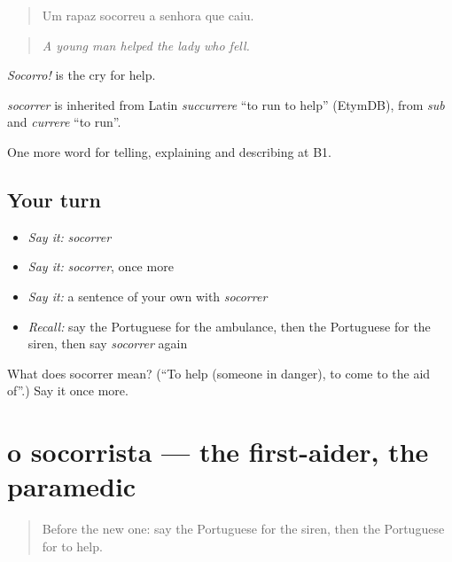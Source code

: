 \begin{quote}
Um rapaz socorreu a senhora que caiu.
\end{quote}

\begin{quote}
\emph{A young man helped the lady who fell.}
\end{quote}

\emph{Socorro!} is the cry for help.

\begin{cousinweb}
\emph{socorrer} is inherited from Latin \emph{succurrere} \textquotedblleft{}to run to help\textquotedblright{} (EtymDB), from \emph{sub} and \emph{currere} \textquotedblleft{}to run\textquotedblright{}.
\end{cousinweb}

\begin{grammarlens}[title={What you've built}]
One more word for telling, explaining and describing at B1.
\end{grammarlens}

\subsection*{Your turn}
\begin{itemize}
\raggedright
  \item \emph{Say it:} \emph{socorrer}
  \item \emph{Say it:} \emph{socorrer}, once more
  \item \emph{Say it:} a sentence of your own with \emph{socorrer}
  \item \emph{Recall:} say the Portuguese for the ambulance, then the Portuguese for the siren, then say \emph{socorrer} again
\end{itemize}

\begin{tcolorbox}[breakable,colback=teal!4,colframe=teal!35!black,title={Before you move on}]
What does socorrer mean? (\textquotedblleft{}To help (someone in danger), to come to the aid of\textquotedblright{}.) Say it once more.
\end{tcolorbox}
\section[o socorrista]{o socorrista — the first-aider, the paramedic}

\label{lesson:PT-C305-socorrista}



\begin{quote}
Before the new one: say the Portuguese for the siren, then the Portuguese for to help.
\end{quote}

